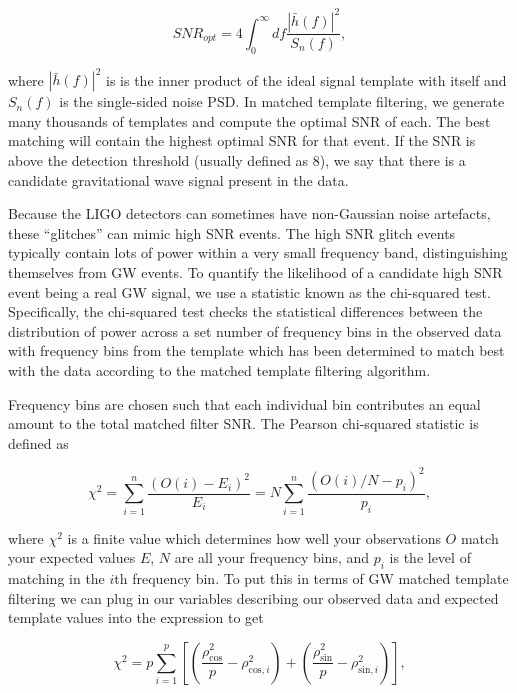 \begin{equation}
    SNR_{opt} = 4 \int_0^{\infty} df \frac{|\bar{h}(f)|^2}{S_{n}(f)},
\end{equation}{}

where $|\bar{h}(f)|^2$ is is the inner product of the ideal signal template with itself and $S_{n}(f)$ is the single-sided noise \ac{PSD}. In matched template filtering, we generate many thousands of templates and compute the optimal \ac{SNR} of each. The best matching will contain the highest optimal \ac{SNR} for that event. If the \ac{SNR} is above the detection threshold (usually defined as 8), we say that there is a candidate gravitational wave signal present in the data.

%
%
Because the \ac{LIGO} detectors can sometimes have non-Gaussian noise artefacts, these ``glitches'' can mimic high \ac{SNR} events. The high \ac{SNR} glitch events typically contain lots of power within a very small frequency band, distinguishing themselves from \ac{GW} events. To quantify the likelihood of a candidate high \ac{SNR} event being a real \ac{GW} signal, we use a statistic known as the chi-squared test. Specifically, the chi-squared test checks the statistical differences between the distribution of power across a set number of frequency bins in the observed data with frequency bins from the template which has been determined to match best with the data according to the matched template filtering algorithm.

Frequency bins are chosen such that each individual bin contributes an equal amount to the total matched filter \ac{SNR}. The Pearson chi-squared statistic is defined as 

\begin{equation}
    \chi^2 = \sum_{i=1}^{n} \frac{(O(i) - E_i)^2}{E_i} 
    = N \sum_{i=1}^{n} \frac{(O(i)/N - p_i)^2}{p_i},
\end{equation}

%
%
where $\chi^2$ is a finite value which determines how well your observations $O$ match your expected values $E$, $N$ are all your frequency bins, and $p_i$ is the level of matching in the $i$th frequency bin. To put this in terms of \ac{GW} matched template filtering we can plug in our variables describing our observed data and expected template values into the expression to get 

\begin{equation} \label{eq:gw_chisquared}
    \chi^2 = p \sum_{i=1}^p \left[  \left( \frac{\rho_{\mathrm{cos}}^2 }{p} - \rho_{\mathrm{cos}, i}^2 \right) 
    + \left( \frac{\rho_{\mathrm{sin}}^2 }{p} - \rho_{\mathrm{sin}, i}^2 \right) \right],
\end{equation}

